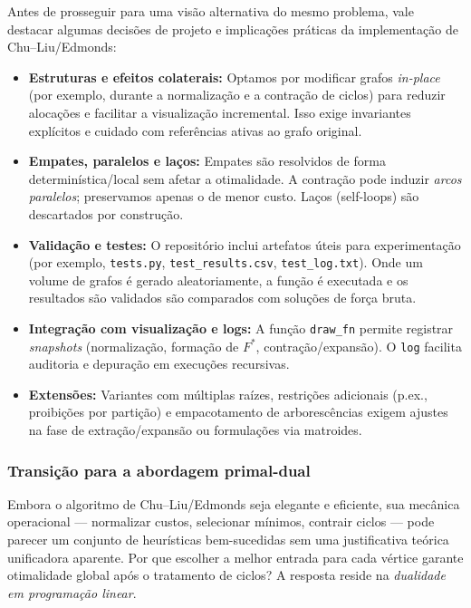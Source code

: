 Antes de prosseguir para uma visão alternativa do mesmo problema, vale destacar algumas decisões de projeto e implicações práticas da implementação de Chu–Liu/Edmonds:
\begin{itemize}\setlength{\itemsep}{2pt}
    \item \textbf{Estruturas e efeitos colaterais:} Optamos por modificar grafos \emph{in-place} (por exemplo, durante a normalização e a contração de ciclos) para reduzir alocações e facilitar a visualização incremental. Isso exige invariantes explícitos e cuidado com referências ativas ao grafo original.
    \item \textbf{Empates, paralelos e laços:} Empates são resolvidos de forma determinística/local sem afetar a otimalidade. A contração pode induzir \emph{arcos paralelos}; preservamos apenas o de menor custo. Laços (self-loops) são descartados por construção.
    \item \textbf{Validação e testes:}  O repositório inclui artefatos úteis para experimentação (por exemplo, \texttt{tests.py}, \texttt{test\_results.csv}, \texttt{test\_log.txt}). Onde um volume de grafos é gerado aleatoriamente, a função é executada e os resultados são validados são comparados com soluções de força bruta.
    \item \textbf{Integração com visualização e logs:} A função \texttt{draw\_fn} permite registrar \emph{snapshots} (normalização, formação de \(F^*\), contração/expansão). O \texttt{log} facilita auditoria e depuração em execuções recursivas.
    \item \textbf{Extensões:} Variantes com múltiplas raízes, restrições adicionais (p.ex., proibições por partição) e empacotamento de arborescências exigem ajustes na fase de extração/expansão ou formulações via matroides.
\end{itemize}

\subsubsection{Transição para a abordagem primal-dual}

Embora o algoritmo de Chu–Liu/Edmonds seja elegante e eficiente, sua mecânica operacional — normalizar custos, selecionar mínimos, contrair ciclos — pode parecer um conjunto de heurísticas bem-sucedidas sem uma justificativa teórica unificadora aparente. Por que escolher a melhor entrada para cada vértice garante otimalidade global após o tratamento de ciclos? A resposta reside na \emph{dualidade em programação linear}.


